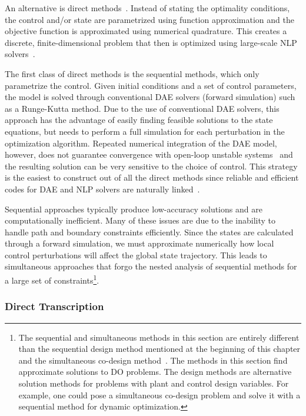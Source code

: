 An alternative is direct methods~\cite{Biegler2010a, Betts2010a}. 
Instead of stating the optimality conditions, the control and/or state are parametrized using function approximation and the objective function is approximated using numerical quadrature.
This creates a discrete, finite-dimensional problem that then is optimized using large-scale NLP solvers~\cite{Biegler2010a}.

The first class of direct methods is the sequential methods, which only parametrize the control.
Given initial conditions and a set of control parameters, the  model is solved through conventional DAE solvers (forward simulation) such as a Runge-Kutta method. 
Due to the use of conventional DAE solvers, this approach has the advantage of easily finding feasible solutions to the state equations, but needs to perform a full simulation for each perturbation in the optimization algorithm.
Repeated numerical integration of the DAE model, however, does not guarantee convergence with open-loop unstable systems~\cite{Biegler2010a} and the resulting solution can be very sensitive to the choice of control.
This strategy is the easiest to construct out of all the direct methods since reliable and efficient codes for DAE and NLP solvers are naturally linked~\cite{Biegler2010a}.

Sequential approaches typically produce low-accuracy solutions and are computationally inefficient.
Many of these issues are due to the inability to handle path and boundary constraints efficiently.
Since the states are calculated through a forward simulation, we must approximate numerically how local control perturbations will affect the global state trajectory. This leads to simultaneous approaches that forgo the nested analysis of sequential methods for a large set of constraints\footnote{The sequential and simultaneous methods in this section are entirely different than the sequential design method mentioned at the beginning of this chapter and the simultaneous co-design method~\cite{Allison2014a, Allison2014b, Biegler2010a}. The methods in this section find approximate solutions to DO problems. The design methods are alternative solution methods for problems with plant and control design variables. For example, one could pose a simultaneous co-design problem and solve it with a sequential method for dynamic optimization.}.

\subsubsection{Direct Transcription \label{sec:ch3:dt}}

